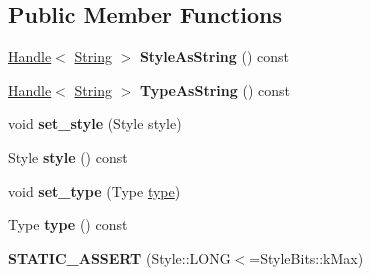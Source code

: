 \subsection*{Public Member Functions}
\begin{DoxyCompactItemize}
\item 
\mbox{\label{classv8_1_1internal_1_1JSListFormat_a026f504bfeb3b38e94421c7645479ae2}} 
\mbox{\hyperlink{classv8_1_1internal_1_1Handle}{Handle}}$<$ \mbox{\hyperlink{classv8_1_1internal_1_1String}{String}} $>$ {\bfseries Style\+As\+String} () const
\item 
\mbox{\label{classv8_1_1internal_1_1JSListFormat_a0adb6802145c8ea79a96d23b169ab43a}} 
\mbox{\hyperlink{classv8_1_1internal_1_1Handle}{Handle}}$<$ \mbox{\hyperlink{classv8_1_1internal_1_1String}{String}} $>$ {\bfseries Type\+As\+String} () const
\item 
\mbox{\label{classv8_1_1internal_1_1JSListFormat_a6a4fb579b463600f40ec408e2a493889}} 
void {\bfseries set\+\_\+style} (Style style)
\item 
\mbox{\label{classv8_1_1internal_1_1JSListFormat_a818b7d18413ce160035dd17d6723de9a}} 
Style {\bfseries style} () const
\item 
\mbox{\label{classv8_1_1internal_1_1JSListFormat_ab06460df08d01e49cd75d754c273417c}} 
void {\bfseries set\+\_\+type} (Type \mbox{\hyperlink{classstd_1_1conditional_1_1type}{type}})
\item 
\mbox{\label{classv8_1_1internal_1_1JSListFormat_ad965cefef0ad024b743badb353616a27}} 
Type {\bfseries type} () const
\item 
\mbox{\label{classv8_1_1internal_1_1JSListFormat_a572a905602514adb4eb4696bedf5aa01}} 
{\bfseries S\+T\+A\+T\+I\+C\+\_\+\+A\+S\+S\+E\+RT} (Style\+::\+L\+O\+NG$<$=Style\+Bits\+::k\+Max)
\item 
\mbox{\label{classv8_1_1internal_1_1JSListFormat_ac683f45fd3fcb162fa7bff0de150ffe0}} 

\end{DoxyCompactItemize}
